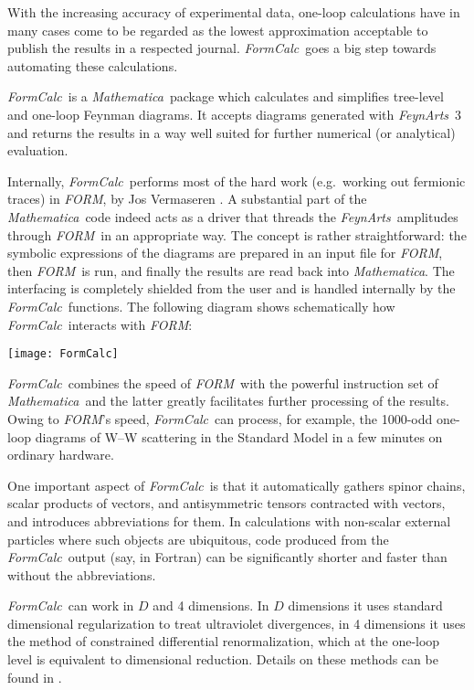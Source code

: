 \documentclass[twoside,11pt]{article}
\def\FA{\textit{FeynArts}}
\def\FC{\textit{FormCalc}}
\def\FO{\textit{FORM}}
\def\mma{\textit{Mathematica}}
\def\eg{e.g.\ }
\begin{document}
With the increasing accuracy of experimental data, one-loop calculations
have in many cases come to be regarded as the lowest approximation
acceptable to publish the results in a respected journal.  \FC\ goes a big
step towards automating these calculations.

\FC\ is a \mma\ package which calculates and simplifies tree-level and
one-loop Feynman diagrams.  It accepts diagrams generated with \FA\ 3
\cite{Ha00} and returns the results in a way well suited for further
numerical (or analytical) evaluation.

Internally, \FC\ performs most of the hard work (\eg working out
fermionic traces) in \FO, by Jos Vermaseren \cite{Ve00}.  A substantial
part of the \mma\ code indeed acts as a driver that threads the \FA\
amplitudes through \FO\ in an appropriate way.  The concept is rather
straightforward: the symbolic expressions of the diagrams are prepared
in an input file for \FO, then \FO\ is run, and finally the results are
read back into \mma.  The interfacing is completely shielded from the user
and is handled internally by the \FC\ functions.  The following diagram
shows schematically how \FC\ interacts with \FO:
\begin{center}
\texttt{[image: FormCalc]}
\end{center}
\FC\ combines the speed of \FO\ with the powerful instruction set of
\mma\ and the latter greatly facilitates further processing of the
results.  Owing to \FO's speed, \FC\ can process, for example, the
1000-odd one-loop diagrams of W--W scattering in the Standard Model in
a few minutes on ordinary hardware.

One important aspect of \FC\ is that it automatically gathers spinor
chains, scalar products of vectors, and antisymmetric tensors contracted
with vectors, and introduces abbreviations for them.  In calculations with
non-scalar external particles where such objects are ubiquitous, code
produced from the \FC\ output (say, in Fortran) can be significantly
shorter and faster than without the abbreviations.%

\FC\ can work in $D$ and 4 dimensions.  In $D$ dimensions it uses standard
dimensional regularization to treat ultraviolet divergences, in 4
dimensions it uses the method of constrained differential renormalization,
which at the one-loop level is equivalent to dimensional reduction.  
Details on these methods can be found in \cite{HaP98}.%
%
%
\end{document}

